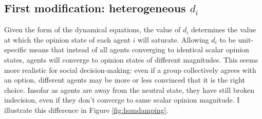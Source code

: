 \documentclass[]{article}
\begin{document}
\subsection{First modification: heterogeneous $d_i$}

Given the form of the dynamical equations, the value of $d_i$ determines the value at which the opinion state of each agent $i$ will saturate. Allowing $d_i$ to be unit-specific means that instead of all agents converging to identical scalar opinion states, agents will converge to opinion states of different magnitudes. This seems more realistic for social decision-making: even if a group collectively agrees with an option, different agents may be more or less convinced that it is the right choice. Insofar as agents are away from the neutral state, they have still broken indecision, even if they don't converge to same scalar opinion magnitude. I illustrate this difference in Figure \ref{fig:homdamping}.
\end{document}

